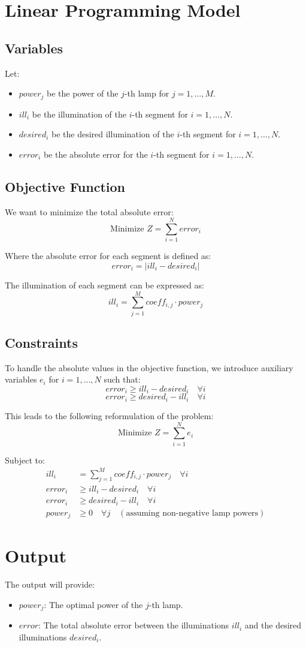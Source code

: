 \documentclass{article}
\begin{document}
\section*{Linear Programming Model}

\subsection*{Variables}
Let:
\begin{itemize}
    \item \( power_j \) be the power of the \( j \)-th lamp for \( j = 1, \ldots, M \).
    \item \( ill_i \) be the illumination of the \( i \)-th segment for \( i = 1, \ldots, N \).
    \item \( desired_i \) be the desired illumination of the \( i \)-th segment for \( i = 1, \ldots, N \).
    \item \( error_i \) be the absolute error for the \( i \)-th segment for \( i = 1, \ldots, N \).
\end{itemize}

\subsection*{Objective Function}
We want to minimize the total absolute error:
\[
\text{Minimize } Z = \sum_{i=1}^{N} error_i
\]

Where the absolute error for each segment is defined as:
\[
error_i = |ill_i - desired_i|
\]

The illumination of each segment can be expressed as:
\[
ill_i = \sum_{j=1}^{M} coeff_{i,j} \cdot power_j
\]

\subsection*{Constraints}
To handle the absolute values in the objective function, we introduce auxiliary variables \( e_i \) for \( i = 1, \ldots, N \) such that:
\[
error_i \geq ill_i - desired_i \quad \forall i
\]
\[
error_i \geq desired_i - ill_i \quad \forall i
\]

This leads to the following reformulation of the problem:
\[
\text{Minimize } Z = \sum_{i=1}^{N} e_i
\]

Subject to:
\[
\begin{align*}
ill_i &= \sum_{j=1}^{M} coeff_{i,j} \cdot power_j \quad \forall i \\
error_i &\geq ill_i - desired_i \quad \forall i \\
error_i &\geq desired_i - ill_i \quad \forall i \\
power_j &\geq 0 \quad \forall j \quad (\text{assuming non-negative lamp powers})
\end{align*}
\]

\section*{Output}
The output will provide:
\begin{itemize}
    \item \( power_j \): The optimal power of the \( j \)-th lamp.
    \item \( error \): The total absolute error between the illuminations \( ill_i \) and the desired illuminations \( desired_i \).
\end{itemize}
\end{document}
